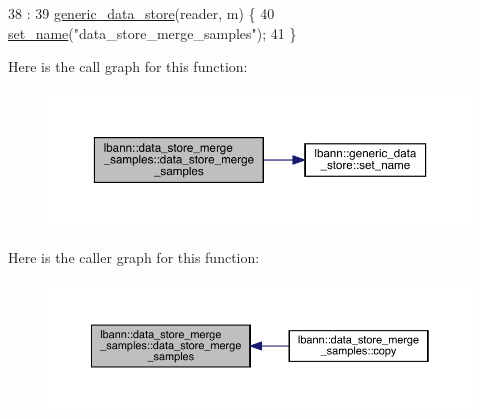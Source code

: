 \begin{DoxyCode}
38                                                                                                           :
39     \hyperlink{classlbann_1_1generic__data__store_acbcd88161c06f4bb9a70bbae857d4ee0}{generic\_data\_store}(reader, m) \{
40   \hyperlink{classlbann_1_1generic__data__store_a853741295a07b5687921fc56d0d7d5b2}{set\_name}(\textcolor{stringliteral}{"data\_store\_merge\_samples"});
41 \}
\end{DoxyCode}
Here is the call graph for this function\+:\nopagebreak
\begin{figure}[H]
\begin{center}
\leavevmode
\includegraphics[width=350pt]{classlbann_1_1data__store__merge__samples_ada5d181e33c9d9fe69979856b7f26268_cgraph}
\end{center}
\end{figure}
Here is the caller graph for this function\+:\nopagebreak
\begin{figure}[H]
\begin{center}
\leavevmode
\includegraphics[width=350pt]{classlbann_1_1data__store__merge__samples_ada5d181e33c9d9fe69979856b7f26268_icgraph}
\end{center}
\end{figure}
\mbox{\label{classlbann_1_1data__store__merge__samples_a0c42f42eaedbcf4be23fbb5b1f3d46b1}} 
